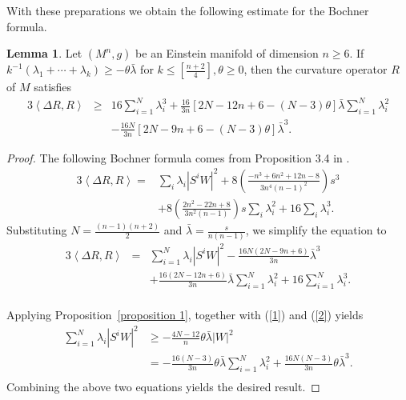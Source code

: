 \documentclass[11pt, reqno]{amsart}
\numberwithin{equation}{section}
\theoremstyle{definition}
\newtheorem{lemma}[thm]{Lemma}
\begin{document}
	With these preparations we obtain the following estimate for the Bochner formula.
	\begin{lemma} \label{lemma3}
		Let $(M^n,g)$ be an Einstein manifold of dimension $n \ge 6$. If $k^{-1}({\lambda }_1+\cdots +{\lambda }_k)\ge -\theta \bar{\lambda }$ for $ k\le [\frac{n+2}{4}], \theta \ge 0$, then the curvature operator $R$ of $M$ satisfies
		\begin{eqnarray}
			3\left\langle \Delta R,R \right\rangle &\ge& 16\sum\limits_{i=1}^{N}{\lambda _{i}^3}+\frac{16}{3n}[2N-12n+6-(N-3)\theta ]\bar{\lambda }\sum\limits_{i=1}^{N}{\lambda _{i}^2} \nonumber\\ 
			&& -\frac{16N}{3n}[2N-9n+6-(N-3)\theta ]\bar{\lambda }^3.\label{3} 
		\end{eqnarray}
	\end{lemma}
	\begin{proof}
		The following Bochner formula comes from Proposition 3.4 in \cite{DF}.
		\begin{align*}
			3\left\langle \Delta R,R \right\rangle =&\sum\limits_{i}{{\lambda }_i\left| S^{i}W \right|^2}+8\left( \frac{-n^3+6n^2+12n-8}{3n^4(n-1)^2} \right)s^3 \\ 
			& +8\left( \frac{2n^2-22n+8}{3n^2(n-1)} \right)s\sum\limits_{i}{\lambda _{i}^2}+16\sum\limits_{i}{\lambda _{i}^3}. 
		\end{align*}
		Substituting $N=\frac{(n-1)(n+2)}{2}$ and $\bar{\lambda }=\frac{s}{n(n-1)}$, we simplify the equation to
		\begin{eqnarray*}
			3\left\langle \Delta R,R \right\rangle &=&\sum\limits_{i=1}^{N}{{{\lambda }_{i}}{{\left| {{S}^{i}}W \right|}^{2}}}-\frac{16N(2N-9n+6)}{3n}{{{\bar{\lambda }}}^{3}} \\ 
			&&+\frac{16(2N-12n+6)}{3n}\bar{\lambda }\sum\limits_{i=1}^{N}{\lambda _{i}^{2}}+16\sum\limits_{i=1}^{N}{\lambda _{i}^{3}}. \\ 
		\end{eqnarray*}
		
		Applying Proposition~\ref{proposition 1}, together with (\ref{1}) and (\ref{2}) yields
		\[\begin{aligned}
			\sum\limits_{i=1}^{N}{{\lambda }_i\left| S^{i}W \right|^2}&\ge -\frac{4N-12}{n}\theta \bar{\lambda }\left| W \right|^2 \\ 
			& =-\frac{16(N-3)}{3n}\theta \bar{\lambda }\sum\limits_{i=1}^{N}{{\lambda}_{i}^2}+\frac{16N(N-3)}{3n}\theta \bar{\lambda }^3. \\ 
		\end{aligned}\]
		Combining the above two equations yields the desired result. 
	\end{proof} 
\end{document}
